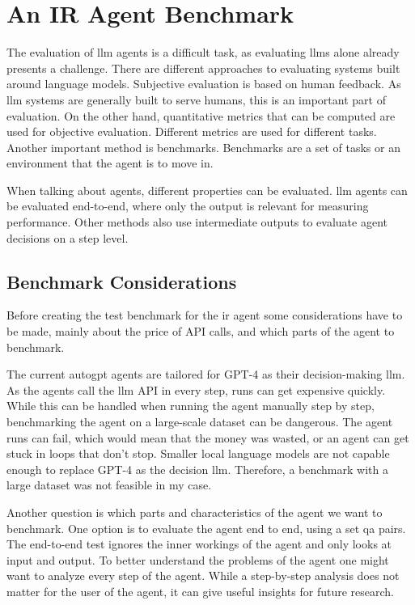 \documentclass[../main.tex]{subfiles}
\begin{document}
\chapter{An IR Agent Benchmark}
\label{ch:benchmarks}

The evaluation of \gls{llm} agents is a difficult task,
as evaluating \glspl{llm} alone already presents a challenge. %
There are different approaches to evaluating systems built around language models.
Subjective evaluation is based on human feedback.
As \gls{llm} systems are generally built to serve humans, this is an important part of evaluation.
On the other hand,
quantitative metrics that can be computed are used for objective evaluation.
Different metrics are used for different tasks. Another important method is benchmarks.
Benchmarks are a set of tasks or an environment that the agent is to move in.

When talking about agents, different properties can be evaluated.
\gls{llm} agents can be evaluated end-to-end, where only the output is
relevant for measuring performance.
Other methods also use intermediate outputs to evaluate agent decisions on a step level.

\section{Benchmark Considerations}

Before creating the test benchmark for the \gls{ir} agent some considerations
have to be made, mainly about the price of API calls, and which parts of the agent
to benchmark.

The current \gls{autogpt} agents are tailored for GPT-4 as their decision-making
\gls{llm}.
As the agents call the \gls{llm} API in every step,
runs can get expensive quickly.
While this can be handled when running the agent manually step by step,
benchmarking the agent on a large-scale dataset can be dangerous.
The agent runs can fail, which would mean that the money was wasted,
or an agent can get stuck in loops that don't stop.
Smaller local language models are not capable enough to replace GPT-4
as the decision \gls{llm}.
Therefore, a benchmark with a large dataset was not feasible in my case.

Another question is which parts and characteristics of the agent we want to benchmark.
One option is to evaluate the agent end to end, using a set \gls{qa} pairs.
The end-to-end test ignores the inner workings of the agent and only looks at
input and output.
To better understand the problems of the agent one might want to analyze every
step of the agent.
While a step-by-step analysis does not matter for the user of the agent,
it can give useful insights for future research.
\end{document}
